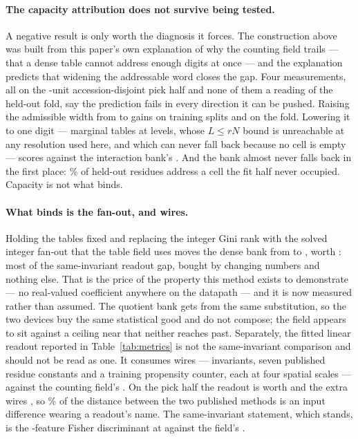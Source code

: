 \documentclass[11pt]{article}
\begin{document}
\paragraph{The capacity attribution does not survive being tested.} A negative
result is only worth the diagnosis it forces. The construction above was built
from this paper's own explanation of why the counting field trails --- that a
dense table cannot address enough digits at once --- and the explanation
predicts that widening the addressable word closes the gap. Four measurements,
all on the \GapPickUnits{}-unit accession-disjoint pick half and none of them a
reading of the held-out fold, say the prediction fails in every direction it can
be pushed. Raising the admissible width from \QuoDenseWidth{} to \QuoSymWidth{}
gains \QuoTrainGain{} on training splits and \QuoDAf{} on the fold. Lowering it
to one digit --- \GapMarginalTables{} marginal tables at \GapMarginalLevels{}
levels, whose \(L \le rN\) bound is unreachable at any resolution used here, and
which can never fall back because no cell is empty --- scores \GapMarginalAuc{}
against the interaction bank's \GapTablesSmall{}. And the bank almost never
falls back in the first place: \GapUnseenPct{}\% of held-out residues address a
cell the fit half never occupied. Capacity is not what binds.

\paragraph{What binds is the fan-out, and \GapExtraWires{} wires.} Holding the
tables fixed and replacing the integer Gini rank with the solved integer fan-out
that the table field uses moves the dense bank from \GapTablesSmall{} to
\GapFanoutSolved{}, worth \GapFanoutPrice{}: most of the same-invariant readout
gap, bought by changing \NAlgTables{} numbers and nothing else. That is the
price of the property this method exists to demonstrate --- no real-valued
coefficient anywhere on the datapath --- and it is now measured rather than
assumed. The quotient bank gets \GapFanoutQuo{} from the same substitution, so
the two devices buy the same statistical good and do not compose; the field
appears to sit against a ceiling near \GapFanoutSolved{} that neither reaches
past. Separately, the fitted linear readout reported in
Table~\ref{tab:metrics} is not the same-invariant comparison and should not be
read as one. It consumes \GapWideWires{} wires --- \NAlgFeatures{} invariants,
seven published residue constants and a training propensity counter, each at
four spatial scales --- against the counting field's \NAlgFeatures{}. On the
pick half the readout is worth \GapReadout{} and the extra wires
\GapInput{}, so \GapInputShare{}\% of the distance between the two published
methods is an input difference wearing a readout's name. The same-invariant
statement, which stands, is the \NAlgFeatures{}-feature Fisher discriminant at
\FisherAll{} against the field's \AlgAuc{}.
\end{document}
